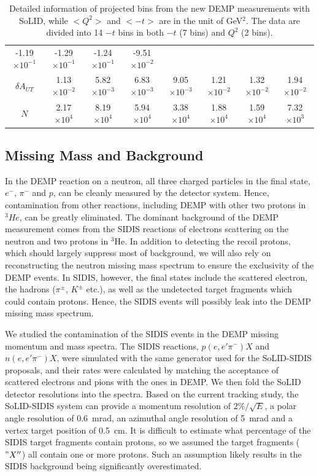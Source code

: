 \begin{table}[!ht]
\begin{tabular}{|c|c|c|c|c|c|c|c|}
-1.19$\times 10^{-1}$ & -1.29$\times 10^{-1}$ & -1.24$\times 10^{-1}$ & -9.51$\times 10^{-2}$ \\
$\delta A_{UT}$&  1.13$\times 10^{-2}$ &  5.82$\times 10^{-3}$ & 6.83$\times 10^{-3}$ 
& 9.05$\times 10^{-3}$ & 1.21$\times 10^{-2}$ & 1.32$\times 10^{-2}$ & 1.94$\times 10^{-2}$ \\
$N$          &  2.17$\times 10^{4}$ &  8.19$\times 10^{4}$ & 5.94$\times 10^{4}$ &
  3.38$\times 10^{4}$ & 1.88$\times 10^{4}$ & 1.59$\times 10^{4}$ & 7.32$\times 10^{3}$ \\
\hline
\end{tabular}
\caption[Detailed information of projected bins]{\footnotesize{Detailed
information of projected bins from the new DEMP measurements with SoLID, while
$<Q^{2}>$ and $<-t>$ are in the unit of GeV$^{2}$. The data are
divided into 14 $-t$ bins in both $-t$ (7 bins) and $Q^{2}$ (2 bins).}}
\label{asym_bin_table}
\end{table} 

\subsection{Missing Mass and Background}

In the DEMP reaction on a neutron, all three charged particles in the final state, $e^{-}$, $\pi^{-}$ and $p$,
can be cleanly measured by the detector system.  Hence, contamination from other reactions, including
DEMP with other two protons in $^{3}He$, can be greatly eliminated.  The
dominant background of the DEMP measurement comes from the SIDIS reactions of
electrons scattering on the neutron and two protons in $\mathrm{^{3}He}$. In
addition to detecting the recoil protons, which should largely suppress most of
background, we will also rely on reconstructing the neutron missing mass
spectrum to ensure the exclusivity of the DEMP events. In SIDIS, however, the
final states include the scattered electron, the hadrons ($\pi^{\pm}$,
$K^{\pm}$ etc.), as well as the undetected target fragments which could contain
protons. Hence, the SIDIS events will possibly leak into the DEMP missing mass
spectrum.

We studied the contamination of the SIDIS events in the DEMP missing momentum
and mass spectra. The SIDIS reactions, $p(e,e'\pi^{-})X$ and $n(e,e'\pi^{-})X$,
were simulated with the same generator used for the SoLID-SIDIS proposals, and
their rates were calculated by matching the acceptance of scattered electrons
and pions with the ones in DEMP. We then fold the SoLID detector resolutions
into the spectra. Based on the current tracking study, the SoLID-SIDIS system
can provide a momentum resolution of $2\%/\sqrt{E}$, a polar angle
resolution of 0.6~mrad, an azimuthal angle resolution of 5~mrad and a
vertex target position of 0.5~cm. It is difficult to estimate what
percentage of the SIDIS target fragments contain protons, so we assumed
the target fragments ($"X''$) all contain one or more protons. Such an
assumption likely results in the SIDIS background being significantly
overestimated.

